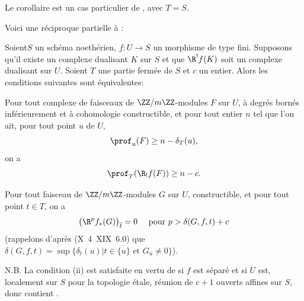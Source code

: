Le corollaire est un cas particulier de , avec $T=S$.

Voici une r\'eciproque partielle \`a :

\begin{proposition} \label{XIV.4.7}
Soient\pageoriginale $S$ un sch\'ema noeth\'erien, $f\colon U\to S$ un morphisme de type fini. Supposons qu'il existe un complexe dualisant $K$ sur $S$ et que $\R^{!}f(K)$ soit un complexe dualisant sur $U$. Soient $T$ une partie ferm\'ee de $S$ et $c$ un entier. Alors les conditions suivantes sont \'equivalentes:
\begin{enumeratei}
\item
Pour tout complexe de faisceaux de $\ZZ/m\ZZ$-modules $F$ sur $U$, \`a degr\'es born\'es inf\'erieurement et \`a cohomologie constructible, et pour tout entier $n$ tel que l'on ait, pour tout point $u$ de $U$,
$$
\prof_{u}(F)\geq n-\delta_{T}(u),
$$
on a
$$
\prof_{T}(\R_{!}f(F))\geq n-c.
$$

\item
Pour tout faisceau de $\ZZ/m\ZZ$-modules $G$ sur $U$, constructible, et pour tout point $t\in T$, on a
$$
\big(\R^{p}f_{\ast}(G)\big)_{\overline{t}}=0\quad\textrm{ pour }p>\delta(G, f, t)+c$$
(rappelons d'apr\`es (\textup{\SGA X~4~XIX~6.0}) que $\delta(G, f, t)=\sup\{ \delta_{t}(u)|t\in\overline{\{ u\} }\textrm{ et }G_{\overline{u}}\neq 0\}$).
\end{enumeratei}
\end{proposition}

N.B. La condition \textup{(ii)} est satisfaite en vertu de  si $f$ est s\'epar\'e et si $U$ est, localement sur $S$ pour la topologie \'etale, r\'eunion de $c+1$ ouverts affines sur $S$, donc  contient .

